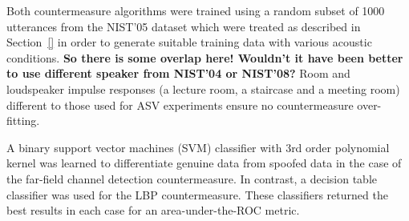 Both countermeasure algorithms were trained using a random subset of 1000 utterances from the NIST'05 dataset which were treated as described in Section~\ref{} in order to generate suitable training data with various acoustic conditions.  {\bfseries So there is some overlap here!  Wouldn't it have been better to use different speaker from NIST'04 or NIST'08?} Room and loudspeaker impulse responses (a lecture room, a staircase and a meeting room) different to those used for ASV experiments ensure no countermeasure over-fitting.

A binary support vector machines (SVM) classifier with 3rd order polynomial kernel was learned to differentiate genuine data from spoofed data in the case of the far-field channel detection countermeasure.  In contrast, a decision table classifier was used for the LBP countermeasure.  These classifiers returned the best results in each case for an area-under-the-ROC metric.  %
